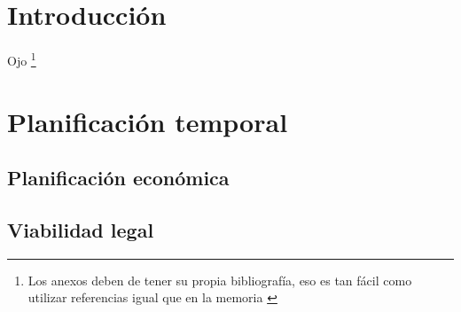 
\section{Introducción}

Ojo \footnote{Los anexos deben de tener su propia bibliografía, eso es tan fácil como utilizar referencias igual que en la memoria \cite{bortolot2005}}

\section{Planificación temporal}

\subsection{Planificación económica}

\subsection{Viabilidad legal}


